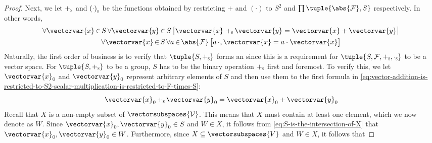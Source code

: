 \begin{proof}
    \vspace{0.3cm}
    \noindent
    Next, we let \( \smallsubscript{+}{S} \) and \( \smallsubscript{(\cdot)}{S} \) be the functions obtained by restricting \( + \) and \( (\cdot) \)
    to \( S^{2} \) and \( \prod \tuple{\abs{\mathcal{F}}, S} \) respectively.
    In other words,
    \begin{equation}
        \label{eq:vector-addition-is-restricted-to-S2-scalar-multiplication-is-restricted-to-F-times-S}
        \begin{gathered}
            \forall \vectorvar{x}\,{\in}\,S \, \forall \vectorvar{y}\,{\in}\,S \,
            \big[ \vectorvar{x} \,\, \smallsubscript{+}{S} \, \vectorvar{y} = \vectorvar{x} + \vectorvar{y} \big]\\
            \forall \vectorvar{x}\,{\in}\,S \, \forall a\,{\in}\,\abs{\mathcal{F}} \,
            \big[ a \, \smallsubscript{\cdot}{S} \, \vectorvar{x} = a \cdot \vectorvar{x} \big]
        \end{gathered}
    \end{equation}
    Naturally, the first order of business is to verify that \( \tuple{S, \smallsubscript{+}{S}} \) forms an  since
    this is a requirement for \( \tuple{S, \mathcal{F}, \smallsubscript{+}{S}, \smallsubscript{\cdot}{S}} \) to be a vector space.
    For \( \tuple{S, \smallsubscript{+}{S}} \) to be a group, \( S \) has to be 
    the binary operation \( \smallsubscript{+}{S} \) first and foremost.
    To verify this, we let \( \vectorvar{x}_{0} \) and \( \vectorvar{y}_{0} \) represent arbitrary elements of \( S \)
    and then use them to  the first formula in
    \eqref{eq:vector-addition-is-restricted-to-S2-scalar-multiplication-is-restricted-to-F-times-S}:
    \begin{equation}
        \label{eq:instantiated-vector-addition-restricted-to-S2}
        \vectorvar{x}_{0} \, \smallsubscript{+}{S} \, \vectorvar{y}_{0} = \vectorvar{x}_{0} + \vectorvar{y}_{0}
    \end{equation}
    Recall that \( X \) is a non-empty subset of \( \vectorsubspaces{\mathcal{V}} \).
    This means that \( X \) must contain at least one element, which we now denote as \( W \). 
    Since \( \vectorvar{x}_{0}, \vectorvar{y}_{0} \in S \) and \( W \in X \), it follows from \eqref{eq:S-is-the-intersection-of-X} that
    \( \vectorvar{x}_{0}, \vectorvar{y}_{0} \in W \). Furthermore, since \( X \subseteq \vectorsubspaces{V} \) and \( W \in X \), it follows that

\end{proof}
